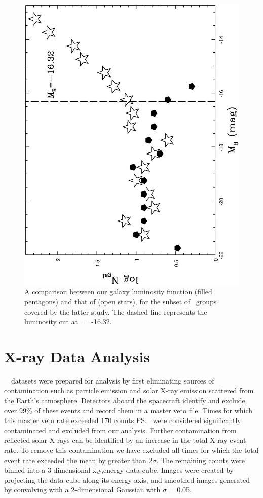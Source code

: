 \documentclass[usenatbib]{mn2e}
\begin{document}
\begin{figure}
  \includegraphics[height=\linewidth,angle=270]{fig_02.ps}
  \caption{A comparison between our galaxy luminosity function (filled pentagons)
           and that of \citet{miles04} (open stars), for the subset of \GEMS\
           groups covered by the latter study.  The dashed line represents the
           luminosity cut at \MB\ = -16.32.}
  \label{fig_lumfun}
\end{figure}




\section{X-ray Data Analysis}
\label{sec_reduction}

\ROSAT\ \PSPC\ datasets were prepared for analysis by first eliminating sources
of contamination such as particle emission and solar X-ray emission scattered
from the Earth's atmosphere.  Detectors aboard the spacecraft identify and
exclude over 99\% of these events and record them in a master veto file.  Times
for which this master veto rate exceeded 170 counts \ps\ were considered
significantly contaminated and excluded from our analysis.  Further contamination
from reflected solar X-rays can be identified by an increase in the total X-ray
event rate.  To remove this contamination we have excluded all times for which
the total event rate exceeded the mean by greater than 2$\sigma$.  The remaining
counts were binned into a 3-dimensional x,y,energy data cube.  Images were
created by projecting the data cube along its energy axis, and smoothed images
generated by convolving with a 2-dimensional Gaussian with $\sigma$ = 0.05\arcm.
\end{document}
